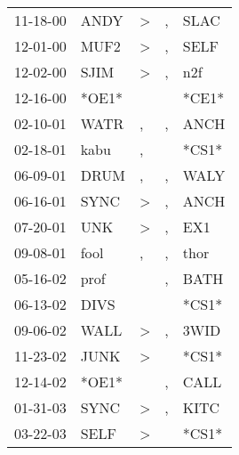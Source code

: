 \begin{supertabular}{p{0.07\textwidth}p{0.06\textwidth}p{0.02\textwidth}p{0.02\textwidth}p{0.06\textwidth}}
 11-18-00\textsuperscript{} &  ANDY\textsuperscript{} &  \textgreater &  , &           SLAC\textsuperscript{} \\
 12-01-00\textsuperscript{} &  MUF2\textsuperscript{} &  \textgreater &  , &           SELF\textsuperscript{} \\
 12-02-00\textsuperscript{} &  SJIM\textsuperscript{} &  \textgreater &  , &            n2f\textsuperscript{} \\
 12-16-00\textsuperscript{} &                   *OE1* &               &    &                            *CE1* \\
 02-10-01\textsuperscript{} &  WATR\textsuperscript{} &             , &  , &           ANCH\textsuperscript{} \\
 02-18-01\textsuperscript{} &  kabu\textsuperscript{} &             , &    &                            *CS1* \\
 06-09-01\textsuperscript{} &  DRUM\textsuperscript{} &             , &  , &           WALY\textsuperscript{} \\
 06-16-01\textsuperscript{} &  SYNC\textsuperscript{} &  \textgreater &  , &           ANCH\textsuperscript{} \\
 07-20-01\textsuperscript{} &   UNK\textsuperscript{} &  \textgreater &  , &            EX1\textsuperscript{} \\
 09-08-01\textsuperscript{} &  fool\textsuperscript{} &             , &  , &           thor\textsuperscript{} \\
 05-16-02\textsuperscript{} &  prof\textsuperscript{} &               &  , &           BATH\textsuperscript{} \\
 06-13-02\textsuperscript{} &  DIVS\textsuperscript{} &               &    &                            *CS1* \\
 09-06-02\textsuperscript{} &  WALL\textsuperscript{} &  \textgreater &  , &           3WID\textsuperscript{} \\
 11-23-02\textsuperscript{} &  JUNK\textsuperscript{} &  \textgreater &    &                            *CS1* \\
 12-14-02\textsuperscript{} &                   *OE1* &               &  , &           CALL\textsuperscript{} \\
 01-31-03\textsuperscript{} &  SYNC\textsuperscript{} &  \textgreater &  , &           KITC\textsuperscript{} \\
 03-22-03\textsuperscript{} &  SELF\textsuperscript{} &  \textgreater &    &                            *CS1* \\

\end{supertabular}
